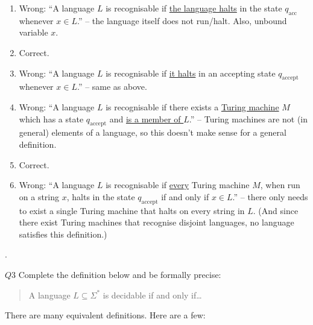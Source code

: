 \documentclass{article}
\theoremstyle{definition}
\theoremstyle{definition}
\theoremstyle{remark}
\begin{document}
\bigskip

\begin{enumerate}
    \item[$(i)$] Wrong: ``A language $L$ is recognisable if \underline{the language halts} in the state $q_\text{acc}$ whenever $x\in L$.'' -- the language itself does not run/halt. Also, unbound variable $x$.
    
    \item[$(ii)$] Correct.

    \item[$(iii)$] Wrong: ``A language $L$ is recognisable if \underline{it halts} in an accepting state $q_\text{accept}$ whenever $x\in L$.'' -- same as above.

    \item[$(iv)$] Wrong: ``A language $L$ is recognisable if there exists a \underline{Turing machine} $M$ which has a state $q_\text{accept}$ and \underline{is a member of $L$}.'' -- Turing machines are not (in general) elements of a language, so this doesn't make sense for a general definition.

    \item[$(v)$] Correct.
    
    \item[$(vi)$] Wrong: ``A language $L$ is recognisable if \underline{every} Turing machine $M$, when run on a string $x$, halts in the state $q_\text{accept}$ if and only if $x\in L$.'' -- there only needs to exist a single Turing machine that halts on every string in $L$. (And since there exist Turing machines that recognise disjoint languages, no language satisfies this definition.)
\end{enumerate}.


\begin{questionbox}{$Q3$}
    Complete the definition below and be formally precise:
    \begin{quote}
        A language $L\subseteq\Sigma^\ast$ is decidable if and only if\ldots
    \end{quote}
\end{questionbox}

\bigskip

There are many equivalent definitions. Here are a few:
\end{document}
